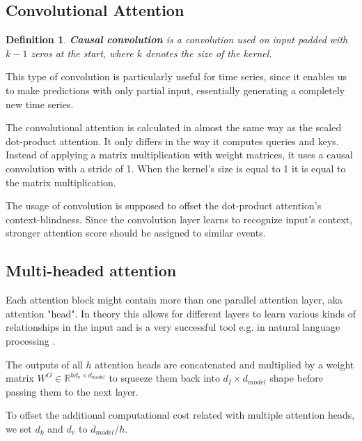 \documentclass[en]{pracamgr}
\newtheorem{defi}{Definition}[section]
\newcommand{\pk}[1]{\textcolor{red}{\small [pk: #1]}}
\begin{document}
\subsection{Convolutional Attention}

\begin{defi}\label{ts}
	\textbf{Causal convolution} is a convolution used on input padded with $k - 1$ zeros at the start, where $k$ denotes the size of the kernel.
	
\end{defi}
%
This type of convolution is particularly useful for time series, since it enables us to make predictions with only partial input, essentially generating a completely new time series.
\newline

The convolutional attention \cite{enhancing} is calculated in almost the same way as the scaled dot-product attention. 
It only differs in the way it computes queries and keys.
Instead of applying a matrix multiplication with weight matrices, it uses a causal convolution with a stride of 1. When the kernel's size is equal to 1 it is equal to the matrix multiplication.

The usage of convolution is supposed to offset the dot-product attention's context-blindness. Since the convolution layer learns to recognize input's context, stronger attention score should be assigned to similar events.

\subsection{Multi-headed attention}

Each attention block might contain more than one parallel attention layer, aka attention "head". In theory this allows for different layers to learn various kinds of relationships in the input and is a very successful tool e.g. in natural language processing \cite{tr}.

The outputs of all $h$ attention heads are concatenated and multiplied by a weight matrix $W^O \in \mathbb{R}^{hd_{v} \times d_{model}}$ to squeeze them back into $d_I \times d_{model}$ shape before passing them to the next layer.

To offset the additional computational cost related with multiple attention heads, we set $d_k$ and $d_v$ to $d_{model} / h$.
\end{document}
